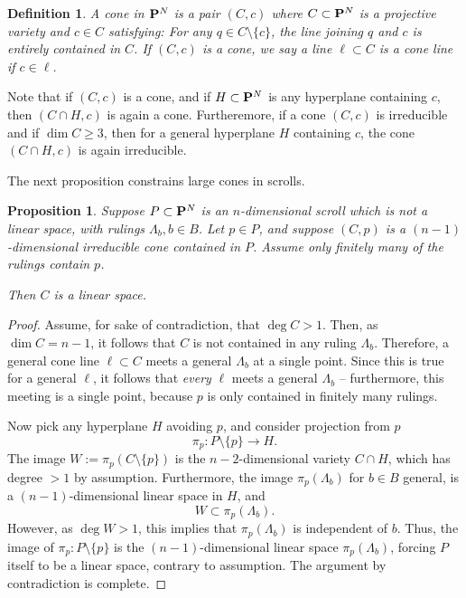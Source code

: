 \documentclass[12pt,reqno]{amsart}
\theoremstyle{plain}
\newtheorem{proposition}[theorem]{Proposition}
\newtheorem{definition}[theorem]{Definition}
\theoremstyle{remark}
\numberwithin{equation}{section}
\renewcommand{\to}{{\longrightarrow}}
\renewcommand {\P}{{\bf P}}
\numberwithin{equation}{section}
\begin{document}
\begin{definition}
  \label{definition:cone} A {\sl cone} in $\P^N$ is a pair $(C,c)$
  where $C \subset \P^N$ is a projective variety and $c \in C$
  satisfying: For any $q \in C \setminus \{c \}$, the line joining $q$
  and $c$ is entirely contained in $C$.  If $(C,c)$ is a cone, we say
  a line $\ell \subset C$ is a {\sl cone line} if $c \in \ell$.
\end{definition}

Note that if $(C,c)$ is a cone, and if $H \subset \P^N$ is any
hyperplane containing $c$, then $(C \cap H, c)$ is again a cone.
Furtheremore, if a cone $(C,c)$ is irreducible and if $\dim C \geq 3$,
then for a general hyperplane $H$ containing $c$, the cone
$(C \cap H, c)$ is again irreducible.

The next proposition constrains large cones in scrolls.

\begin{proposition}
  \label{proposition:scrolls}
  Suppose $P \subset \P^{N}$ is an $n$-dimensional scroll which is not
  a linear space, with rulings $\Lambda_{b}, b \in B$. Let $p \in P$,
  and suppose $(C,p)$ is a $(n-1)$-dimensional irreducible cone
  contained in $P$.  Assume only finitely many of the rulings contain
  $p$.

  Then $C$ is a linear space.
\end{proposition}

\begin{proof}

  Assume, for sake of contradiction, that $\deg C >1$.  Then, as
  $\dim C = n-1$, it follows that $C$ is not contained in any ruling
  $\Lambda_{b}$.  Therefore, a general cone line $\ell \subset C$
  meets a general $\Lambda_{b}$ at a single point. Since this is true
  for a general $\ell$, it follows that {\sl every} $\ell$ meets a
  general $\Lambda_{b}$ -- furthermore, this meeting is a single
  point, because $p$ is only contained in finitely many rulings.


  Now pick any hyperplane $H$ avoiding $p$, and consider projection
  from $p$
  \[\pi_{p} : P \setminus \{p\} \to H.\]
  The image $W := \pi_{p}(C \setminus \{p\})$ is the $n-2$-dimensional
  variety $C \cap H$, which has degree $>1$ by
  assumption. Furthermore, the image $\pi_{p}(\Lambda_{b})$ for
  $b \in B$ general, is a $(n-1)$-dimensional linear space in $H$,
  and \[W \subset \pi_{p}(\Lambda_{b}).\] However, as $\deg W >1$,
  this implies that $\pi_{p}(\Lambda_{b})$ is independent of $b$.
  Thus, the image of $\pi_{p}:P \setminus \{p\}$ is the
  $(n-1)$-dimensional linear space $\pi_{p}(\Lambda_{b})$, forcing $P$
  itself to be a linear space, contrary to assumption.  The
  argument by contradiction is complete.
\end{proof}
\end{document}
